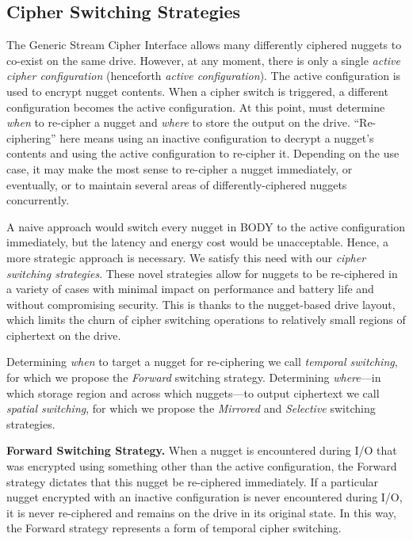 \subsection{Cipher Switching Strategies} \label{subsec:strategies}

The Generic Stream Cipher Interface allows many differently ciphered nuggets to
co-exist on the same drive. However, at any moment, there is only a single
\emph{active cipher configuration} (henceforth \emph{active configuration}). The
active configuration is used to encrypt nugget contents. When a cipher switch is
triggered, a different configuration becomes the active configuration. At this
point, \sys{} must determine \emph{when} to re-cipher a nugget and
\emph{where} to store the output on the drive. ``Re-ciphering'' here means using
an inactive configuration to decrypt a nugget's contents and using the active
configuration to re-cipher it. Depending on the use case, it may make the most
sense to re-cipher a nugget immediately, or eventually, or to maintain several
areas of differently-ciphered nuggets concurrently.

A naive approach would switch every nugget in BODY to the active configuration
immediately, but the latency and energy cost would be unacceptable. Hence, a
more strategic approach is necessary. We satisfy this need with our \emph{cipher
switching strategies}. These novel strategies allow for nuggets to be
re-ciphered in a variety of cases with minimal impact on performance and battery
life and without compromising security. This is thanks to the nugget-based drive
layout, which limits the churn of cipher switching operations to relatively
small regions of ciphertext on the drive.

Determining \emph{when} to target a nugget for re-ciphering we call
\emph{temporal switching}, for which we propose the \emph{Forward} switching
strategy. Determining \emph{where}---in which storage region and across which
nuggets---to output ciphertext we call \emph{spatial switching}, for which we
propose the \emph{Mirrored} and \emph{Selective} switching strategies.

\textbf{Forward Switching Strategy.} When a nugget is encountered during I/O
that was encrypted using something other than the active configuration, the
Forward strategy dictates that this nugget be re-ciphered immediately. If a
particular nugget encrypted with an inactive configuration is never encountered
during I/O, it is never re-ciphered and remains on the drive in its original
state. In this way, the Forward strategy represents a form of temporal cipher
switching.

